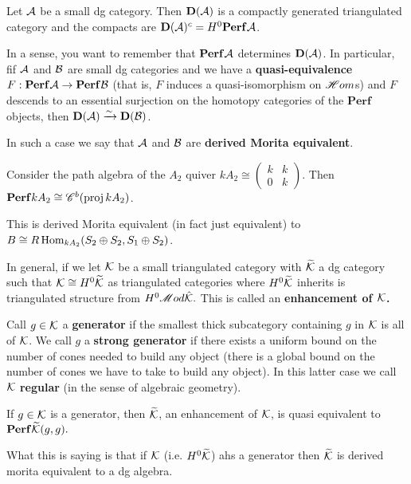 \documentclass[12pt]{article}
\begin{document}
\begin{thm}
	Let $\mathcal{A}$ be a small dg category. Then $\mathbf{D}(\mathcal{A})$ is a compactly generated triangulated category and the compacts are $\mathbf{D}(\mathcal{A})^c=H^0\mathbf{Perf}\mathcal{A}$.
\end{thm}

In a sense, you want to remember that $\mathbf{Perf}\mathcal{A}$ determines $\mathbf{D}(\mathcal{A})$. In particular, fif $\mathcal{A}$ and $\mathcal{B}$ are 
small dg categories and we have a \textbf{quasi-equivalence} $F:\mathbf{Perf}\mathcal{A}\to\mathbf{Perf}\mathcal{B}$ (that is, $F$ induces a quasi-isomorphism on $\mathscr{H} om$s)
and $F$ descends to an essential surjection on the homotopy categories of the $\mathbf{Perf}$ objects, then $\mathbf{D}(\mathcal{A})\xrightarrow{\sim}\mathbf{D}(\mathcal{B})$.

In such a case we say that $\mathcal{A}$ and $\mathcal{B}$ are \textbf{derived Morita equivalent}.
\begin{ex}
	Consider the path algebra of the $A_2$ quiver $kA_2\cong (\begin{smallmatrix}
		k&k\\0&k
	\end{smallmatrix})$. Then $\mathbf{Perf}kA_2\cong\mathscr{C}^b(\operatorname{proj} kA_2)$.

	This is derived Morita equivalent (in fact just equivalent) to $B\cong R\operatorname{Hom}_{kA_2}(S_2\oplus S_2,S_1\oplus S_2)$.
\end{ex}

In general, if we let $\mathcal{K}$ be a small triangulated category with $\widetilde{\mathcal{K}}$ a dg category such that $\mathcal{K}\cong H^0\widetilde{\mathcal{K}}$ as triangulated categories 
where $H^0\widetilde{\mathcal{K}}$ inherits is triangulated structure from $H^0\mathscr{M} od\hat{\mathcal{K}}.$ This is called an \textbf{enhancement of $\mathcal{K}$.}

Call $g\in\mathcal{K}$ a \textbf{generator} if the smallest thick subcategory containing $g$ in $\mathcal{K}$ is all of $\mathcal{K}$. We call $g$ a \textbf{strong generator} if there exists a uniform bound on the number of cones needed to build
any object (there is a global bound on the number of cones we have to take to build any object). In this latter case we call $\mathcal{K}$ \textbf{regular} (in the sense of algebraic geometry).

\begin{thm}[Keller]
	If $g\in\mathcal{K}$ is a generator, then $\widetilde{\mathcal{K}}$, an enhancement of $\mathcal{K}$, is quasi equivalent to $\mathbf{Perf}\widetilde{\mathcal{K}}(g,g).$
\end{thm}
\begin{rmk}
	What this is saying is that if $\mathcal{K}$ (i.e. $H^0\widetilde{\mathcal{K}}$) ahs a generator then $\widetilde{\mathcal{K}}$ is derived morita equivalent to a dg algebra.
\end{rmk}
\end{document}
